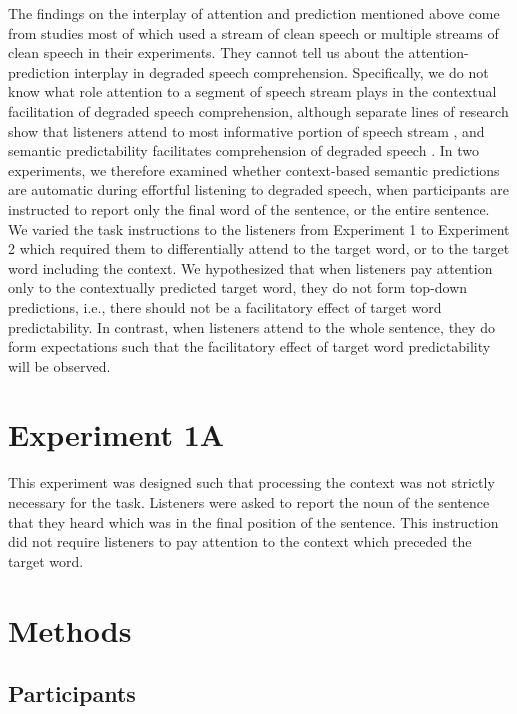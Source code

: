 \documentclass[a4paper, nobind]{templates/ociamthesis}
\begin{document}
The findings on the interplay of attention and prediction mentioned above come from studies most of which used a stream of clean speech or multiple streams of clean speech in their experiments.
They cannot tell us about the attention-prediction interplay in degraded speech comprehension.
Specifically, we do not know what role attention to a segment of speech stream plays in the contextual facilitation of degraded speech comprehension,
although separate lines of research show that listeners attend to most informative portion of speech stream \autocite[e.g.,][]{Astheimer2011}, and semantic predictability facilitates comprehension of degraded speech \autocite[e.g.,][]{Obleser2010}.
In two experiments, we therefore examined whether context-based semantic predictions are automatic during effortful listening to degraded speech, when participants are instructed to report only the final word of the sentence, or the entire sentence.
We varied the task instructions to the listeners from Experiment 1 to Experiment 2 which required them to differentially attend to the target word, or to the target word including the context.
We hypothesized that when listeners pay attention only to the contextually predicted target word, they do not form top-down predictions, i.e., there should not be a facilitatory effect of target word predictability.
In contrast, when listeners attend to the whole sentence, they do form expectations such that the facilitatory effect of target word predictability will be observed.

\hypertarget{experiment-1a}{%
\section{Experiment 1A}\label{experiment-1a}}

This experiment was designed such that processing the context was not strictly necessary for the task.
Listeners were asked to report the noun of the sentence that they heard which was in the final position of the sentence.
This instruction did not require listeners to pay attention to the context which preceded the target word.

\hypertarget{methods}{%
\section{Methods}\label{methods}}

\hypertarget{participants}{%
\subsection{Participants}\label{participants}}
\end{document}
